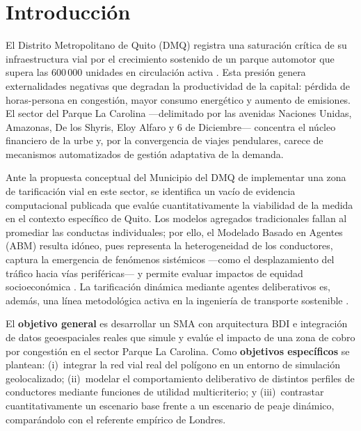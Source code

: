 \documentclass[twocolumn,10pt]{article}
\begin{document}
\section{Introducci\'on}
El Distrito Metropolitano de Quito (DMQ) registra una saturaci\'on cr\'itica de su
infraestructura vial por el crecimiento sostenido de un parque automotor que supera
las 600\,000 unidades en circulaci\'on activa \cite{inec2023}. Esta presi\'on genera
externalidades negativas que degradan la productividad de la capital: p\'erdida de
horas-persona en congesti\'on, mayor consumo energ\'etico y aumento de emisiones. El
sector del Parque La Carolina ---delimitado por las avenidas Naciones Unidas, Amazonas,
De los Shyris, Eloy Alfaro y 6 de Diciembre--- concentra el n\'ucleo financiero de la
urbe y, por la convergencia de viajes pendulares, carece de mecanismos automatizados de
gesti\'on adaptativa de la demanda.

Ante la propuesta conceptual del Municipio del DMQ de implementar una zona de
tarificaci\'on vial en este sector, se identifica un vac\'io de evidencia computacional
publicada que eval\'ue cuantitativamente la viabilidad de la medida en el contexto
espec\'ifico de Quito. Los modelos agregados tradicionales fallan al promediar las
conductas individuales; por ello, el Modelado Basado en Agentes (ABM) resulta id\'oneo,
pues representa la heterogeneidad de los conductores, captura la emergencia de
fen\'omenos sist\'emicos ---como el desplazamiento del tr\'afico hacia v\'ias
perif\'ericas--- y permite evaluar impactos de equidad socioecon\'omica
\cite{gama2023,etrr2023}. La tarificaci\'on din\'amica mediante agentes deliberativos es,
adem\'as, una l\'inea metodol\'ogica activa en la ingenier\'ia de transporte sostenible
\cite{magtToll2024,kaddoura2019}.

El \textbf{objetivo general} es desarrollar un SMA con arquitectura BDI e integraci\'on
de datos geoespaciales reales que simule y eval\'ue el impacto de una zona de cobro por
congesti\'on en el sector Parque La Carolina. Como \textbf{objetivos espec\'ificos} se
plantean: (i)~integrar la red vial real del pol\'igono en un entorno de simulaci\'on
geolocalizado; (ii)~modelar el comportamiento deliberativo de distintos perfiles de
conductores mediante funciones de utilidad multicriterio; y (iii)~contrastar
cuantitativamente un escenario base frente a un escenario de peaje din\'amico,
compar\'andolo con el referente emp\'irico de Londres.
\end{document}
